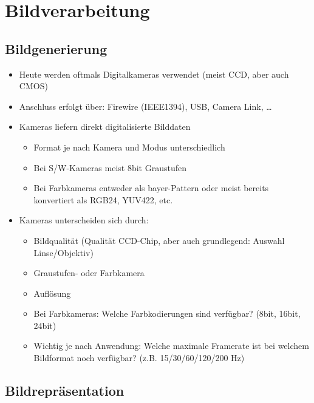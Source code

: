 
\newcommand{\myfbox}[1]{
\begin{tabular}{|l|}
\hline #1 \\ \hline
\end{tabular}
}

\chapter{Bildverarbeitung}

\section{Bildgenerierung}

\begin{itemize}
\item Heute werden oftmals Digitalkameras verwendet (meist CCD, aber auch CMOS)
\item Anschluss erfolgt über: Firewire (IEEE1394), USB, Camera Link, \dots
\item Kameras liefern direkt digitalisierte Bilddaten
\begin{itemize}
\item Format je nach Kamera und Modus unterschiedlich
\item Bei S/W-Kameras meist 8bit Graustufen
\item Bei Farbkameras entweder als bayer-Pattern oder meist bereits konvertiert als RGB24, YUV422, etc.
\end{itemize}
\item Kameras unterscheiden sich durch:
\begin{itemize}
\item Bildqualität (Qualität CCD-Chip, aber auch grundlegend: Auswahl Linse/Objektiv)
\item Graustufen- oder Farbkamera
\item Auflösung
\item Bei Farbkameras: Welche Farbkodierungen sind verfügbar? (8bit, 16bit, 24bit)
\item Wichtig je nach Anwendung: Welche maximale Framerate ist bei welchem Bildformat noch verfügbar? (z.B. 15/30/60/120/200 Hz)
\end{itemize}
\end{itemize}

\section{Bildrepräsentation}

